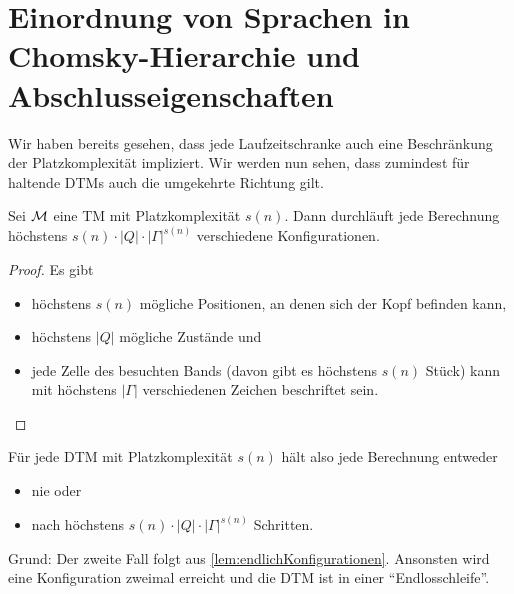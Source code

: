 










\newpage

\section{Einordnung von Sprachen in Chomsky-Hierarchie und Abschlusseigenschaften}

Wir haben bereits gesehen, dass jede Laufzeitschranke auch eine Beschränkung der Platzkomplexität impliziert.
Wir werden nun sehen, dass zumindest für haltende \ac{DTM}s auch die umgekehrte Richtung gilt.
\begin{lemma}\label{lem:endlichKonfigurationen}
 Sei $\mathcal{M}$ eine \ac{TM} mit Platzkomplexität $s(n)$.
 Dann durchläuft jede Berechnung höchstens $s(n)\cdot |Q| \cdot |\Gamma|^{s(n)}$
 verschiedene Konfigurationen.
\end{lemma}
\begin{proof}
 Es gibt 
 \begin{itemize}
  \item höchstens $s(n)$ mögliche Positionen, an denen sich der Kopf befinden kann,
  \item höchstens $|Q|$ mögliche Zustände und
  \item jede Zelle des besuchten Bands (davon gibt es höchstens $s(n)$ Stück) kann mit höchstens $|\Gamma|$ verschiedenen Zeichen beschriftet sein. \qedhere
 \end{itemize}
\end{proof}

\begin{Bemerkung}
 Für jede \ac{DTM} mit Platzkomplexität $s(n)$ hält also jede Berechnung entweder
 \begin{itemize}
  \item nie oder
  \item nach höchstens $s(n)\cdot |Q| \cdot |\Gamma|^{s(n)}$ Schritten.
 \end{itemize}
Grund: Der zweite Fall folgt aus \autoref{lem:endlichKonfigurationen}. Ansonsten wird eine Konfiguration zweimal erreicht und die \ac{DTM} ist in einer "`Endlosschleife"'.
\end{Bemerkung}


